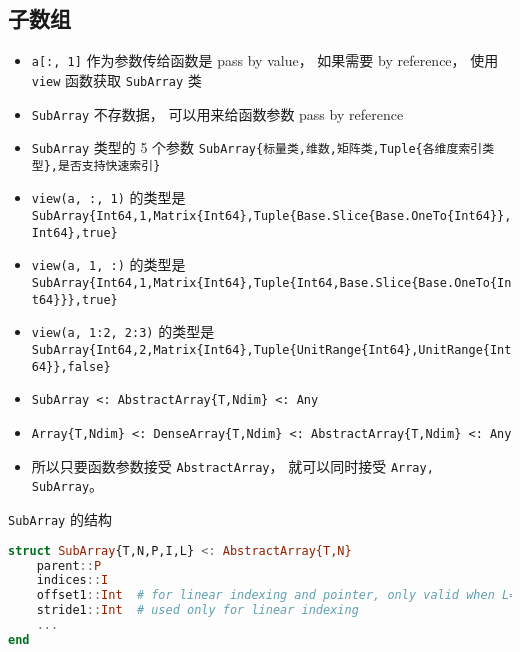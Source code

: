 \subsection{子数组}
\begin{itemize}
\item \verb`a[:, 1]` 作为参数传给函数是 pass by value， 如果需要 by reference， 使用 \verb`view` 函数获取 \verb`SubArray` 类
\item \verb`SubArray` 不存数据， 可以用来给函数参数 pass by reference
\item \verb`SubArray` 类型的 5 个参数 \verb`SubArray{标量类,维数,矩阵类,Tuple{各维度索引类型},是否支持快速索引}`
\item \verb`view(a, :, 1)` 的类型是 \verb`SubArray{Int64,1,Matrix{Int64},Tuple{Base.Slice{Base.OneTo{Int64}},Int64},true}`
\item \verb`view(a, 1, :)` 的类型是 \verb`SubArray{Int64,1,Matrix{Int64},Tuple{Int64,Base.Slice{Base.OneTo{Int64}}},true}`
\item \verb`view(a, 1:2, 2:3)` 的类型是 \verb`SubArray{Int64,2,Matrix{Int64},Tuple{UnitRange{Int64},UnitRange{Int64}},false}`
\item \verb`SubArray <: AbstractArray{T,Ndim} <: Any`
\item \verb`Array{T,Ndim} <: DenseArray{T,Ndim} <: AbstractArray{T,Ndim} <: Any`
\item 所以只要函数参数接受 \verb`AbstractArray`， 就可以同时接受 \verb`Array, SubArray`。
\end{itemize}

\verb`SubArray` 的结构
\begin{lstlisting}[language=julia]
struct SubArray{T,N,P,I,L} <: AbstractArray{T,N}
    parent::P
    indices::I
    offset1::Int  # for linear indexing and pointer, only valid when L==true
    stride1::Int  # used only for linear indexing
    ...
end
\end{lstlisting}

